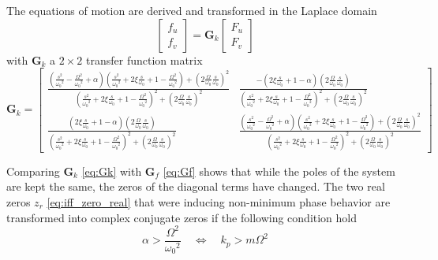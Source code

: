 \documentclass{ISMA_USD2020}
\begin{document}
The equations of motion are derived and transformed in the Laplace domain
\begin{equation}
\label{eq:Gk_mimo_tf}
\begin{bmatrix} f_u \\ f_v \end{bmatrix} =
\bm{G}_k
\begin{bmatrix} F_u \\ F_v \end{bmatrix}
\end{equation}
with \(\bm{G}_k\) a \(2 \times 2\) transfer function matrix
\begin{equation}
\label{eq:Gk}
\bm{G}_k =
\begin{bmatrix}
  \frac{\left( \frac{s^2}{{\omega_0}^2} - \frac{\Omega^2}{{\omega_0}^2} + \alpha \right) \left( \frac{s^2}{{\omega_0}^2} + 2 \xi \frac{s}{\omega_0} + 1 - \frac{{\Omega}^2}{{\omega_0}^2} \right) + \left( 2 \frac{\Omega}{\omega_0} \frac{s}{\omega_0} \right)^2}{\left( \frac{s^2}{{\omega_0}^2} + 2 \xi \frac{s}{\omega_0} + 1 - \frac{{\Omega}^2}{{\omega_0}^2} \right)^2 + \left( 2 \frac{\Omega}{\omega_0} \frac{s}{\omega_0} \right)^2} & \frac{- \left( 2 \xi \frac{s}{\omega_0} + 1 - \alpha \right) \left( 2 \frac{\Omega}{\omega_0} \frac{s}{\omega_0} \right)}{\left( \frac{s^2}{{\omega_0}^2} + 2 \xi \frac{s}{\omega_0} + 1 - \frac{{\Omega}^2}{{\omega_0}^2} \right)^2 + \left( 2 \frac{\Omega}{\omega_0} \frac{s}{\omega_0} \right)^2} \\
  \frac{\left( 2 \xi \frac{s}{\omega_0} + 1 - \alpha \right) \left( 2 \frac{\Omega}{\omega_0} \frac{s}{\omega_0} \right)}{\left( \frac{s^2}{{\omega_0}^2} + 2 \xi \frac{s}{\omega_0} + 1 - \frac{{\Omega}^2}{{\omega_0}^2} \right)^2 + \left( 2 \frac{\Omega}{\omega_0} \frac{s}{\omega_0} \right)^2} & \frac{\left( \frac{s^2}{{\omega_0}^2} - \frac{\Omega^2}{{\omega_0}^2} + \alpha \right) \left( \frac{s^2}{{\omega_0}^2} + 2 \xi \frac{s}{\omega_0} + 1 - \frac{{\Omega}^2}{{\omega_0}^2} \right) + \left( 2 \frac{\Omega}{\omega_0} \frac{s}{\omega_0} \right)^2}{\left( \frac{s^2}{{\omega_0}^2} + 2 \xi \frac{s}{\omega_0} + 1 - \frac{{\Omega}^2}{{\omega_0}^2} \right)^2 + \left( 2 \frac{\Omega}{\omega_0} \frac{s}{\omega_0} \right)^2}
\end{bmatrix}
\end{equation}

Comparing \(\bm{G}_k\) \eqref{eq:Gk} with \(\bm{G}_f\) \eqref{eq:Gf} shows that while the poles of the system are kept the same, the zeros of the diagonal terms have changed.
The two real zeros \(z_r\) \eqref{eq:iff_zero_real} that were inducing non-minimum phase behavior are transformed into complex conjugate zeros if the following condition hold
\begin{equation}
\label{eq:kp_cond_cc_zeros}
  \alpha > \frac{\Omega^2}{{\omega_0}^2} \quad \Leftrightarrow \quad k_p > m \Omega^2
\end{equation}
\end{document}

